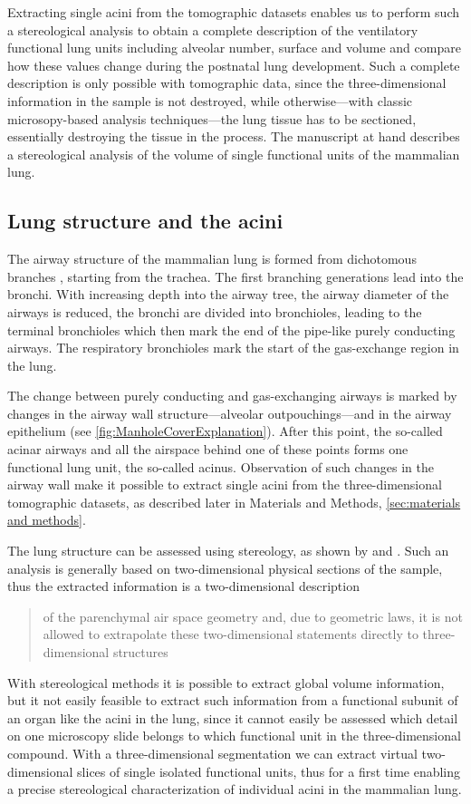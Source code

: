 \documentclass[twoside,paper=a4,abstract=true,english,DIVcalc]{scrartcl}
\begin{document}
Extracting single acini from the tomographic datasets enables us to perform such a stereological analysis to obtain a complete description of the ventilatory functional lung units including alveolar number, surface and volume and compare how these values change during the postnatal lung development. Such a complete description is only possible with tomographic data, since the three-dimensional information in the sample is not destroyed, while otherwise---with classic microsopy-based analysis techniques---the lung tissue has to be sectioned, essentially destroying the tissue in the process. The manuscript at hand describes a stereological analysis of the volume of single functional units of the mammalian lung.

\subsection{Lung structure and the acini}
The airway structure of the mammalian lung is formed from dichotomous branches \cite{Weibel1991}, starting from the trachea. The first branching generations lead into the bronchi. With increasing depth into the airway tree, the airway diameter of the airways is reduced, the bronchi are divided into bronchioles, leading to the terminal bronchioles which then mark the end of the pipe-like purely conducting airways. The respiratory bronchioles mark the start of the gas-exchange region in the lung.

The change between purely conducting and gas-exchanging airways is marked by changes in the airway wall structure---alveolar outpouchings---and in the airway epithelium (see \autoref{fig:ManholeCoverExplanation}). After this point, the so-called acinar airways and all the airspace behind one of these points forms one functional lung unit, the so-called acinus. Observation of such changes in the airway wall make it possible to extract single acini from the three-dimensional tomographic datasets, as described later in Materials and Methods, \autoref{sec:materials and methods}.

The lung structure can be assessed using stereology, as shown by \citet{Hsia2010} and \citet{Tschanz2002}. Such an analysis is generally based on two-dimensional physical sections of the sample, thus the extracted information is a two-dimensional description \blockquote[\cite{Tschanz2002}]{of the parenchymal air space geometry and, due to geometric laws, it is not allowed to extrapolate these two-dimensional statements directly to three-dimensional structures}. With stereological methods it is possible to extract global volume information, but it not easily feasible to extract such information from a functional subunit of an organ like the acini in the lung, since it cannot easily be assessed which detail on one microscopy slide belongs to which functional unit in the three-dimensional compound. With a three-dimensional segmentation we can extract virtual two-dimensional slices of single isolated functional units, thus for a first time enabling a precise stereological characterization of individual acini in the mammalian lung.
\end{document}
